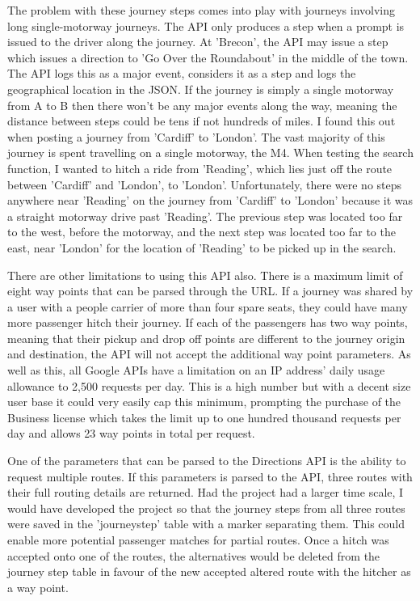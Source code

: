 	The problem with these journey steps comes into play with journeys involving long single-motorway journeys. The API only produces a step when a prompt is issued to the driver along the journey. At 'Brecon', the API may issue a step which issues a direction to 'Go Over the Roundabout' in the middle of the town. The API logs this as a major event, considers it as a step and logs the geographical location in the JSON. If the journey is simply a single motorway from A to B then there won't be any major events along the way, meaning the distance between steps could be tens if not hundreds of miles. I found this out when posting a journey from 'Cardiff' to 'London'. The vast majority of this journey is spent travelling on a single motorway, the M4. When testing the search function, I wanted to hitch a ride from 'Reading', which lies just off the route between 'Cardiff' and 'London', to 'London'. Unfortunately, there were no steps anywhere near 'Reading' on the journey from 'Cardiff' to 'London' because it was a straight motorway drive past 'Reading'. The previous step was located too far to the west, before the motorway, and the next step was located too far to the east, near 'London' for the location of 'Reading' to be picked up in the search.
	
	There are other limitations to using this API also. There is a maximum limit of eight way points that can be parsed through the URL. If a journey was shared by a user with a people carrier of more than four spare seats, they could have many more passenger hitch their journey. If each of the passengers has two way points, meaning that their pickup and drop off points are different to the journey origin and destination, the API will not accept the additional way point parameters. As well as this, all Google APIs have a limitation on an IP address' daily usage allowance to 2,500 requests per day. This is a high number but with a decent size user base it could very easily cap this minimum, prompting the purchase of the Business license\cite{google_api_allowance} which takes the limit up to one hundred thousand requests per day and allows 23 way points in total per request.
	
	One of the parameters that can be parsed to the Directions API is the ability to request multiple routes. If this parameters is parsed to the API, three routes with their full routing details are returned. Had the project had a larger time scale, I would have developed the project so that the journey steps from all three routes were saved in the 'journey\textunderscore step' table with a marker separating them. This could enable more potential passenger matches for partial routes. Once a hitch was accepted onto one of the routes, the alternatives would be deleted from the journey step table in favour of the new accepted altered route with the hitcher as a way point.
	
